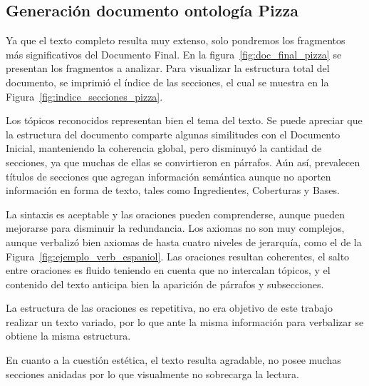 \subsection{Generación documento ontología Pizza}
Ya que el texto completo resulta muy extenso, solo pondremos los fragmentos más significativos del Documento Final. En la figura~\ref{fig:doc_final_pizza} se presentan los fragmentos a analizar. Para visualizar la estructura total del documento, se imprimió el índice de las secciones, el cual se muestra en la Figura~\ref{fig:indice_secciones_pizza}. 

Los tópicos reconocidos representan bien el tema del texto. Se puede apreciar que la estructura del documento comparte algunas similitudes con el Documento Inicial, manteniendo la coherencia global, pero disminuyó la cantidad de secciones, ya que muchas de ellas se convirtieron en párrafos. Aún así, prevalecen títulos de secciones que agregan información semántica aunque no aporten información en forma de texto, tales como Ingredientes, Coberturas y Bases.

La sintaxis es aceptable y las oraciones pueden comprenderse, aunque pueden mejorarse para disminuir la redundancia. Los axiomas no son muy complejos, aunque verbalizó bien axiomas de hasta cuatro niveles de jerarquía, como el de la Figura~\ref{fig:ejemplo_verb_espaniol}. Las oraciones resultan coherentes, el salto entre oraciones es fluido teniendo en cuenta que no intercalan tópicos, y el contenido del texto anticipa bien la aparición de párrafos y subsecciones.

La estructura de las oraciones es repetitiva, no era objetivo de este trabajo realizar un texto variado, por lo que ante la misma información para verbalizar se obtiene la misma estructura.

En cuanto a la cuestión estética, el texto resulta agradable, no posee muchas secciones anidadas por lo que visualmente no sobrecarga la lectura.

